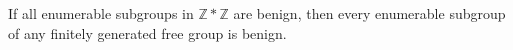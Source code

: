If all enumerable subgroups in $\mathbb{Z} * \mathbb{Z}$ are benign, then every enumerable subgroup of any finitely generated free group is benign.
